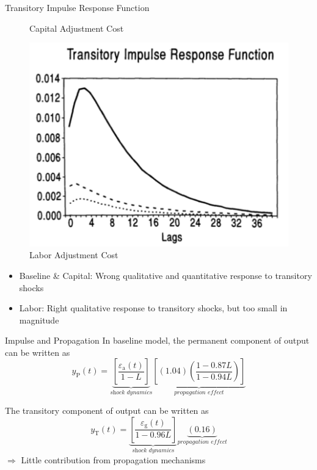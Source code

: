 \documentclass[10pt]{beamer}
\begin{document}
\begin{frame}{Transitory Impulse Response Function}
\begin{minipage}{0.33\textwidth}
\begin{figure}
            \caption{Capital Adjustment Cost}
        \end{figure}
    \end{minipage}%
    \begin{minipage}{0.33\textwidth}
        \begin{figure}
            \centering
            \includegraphics[width=\linewidth]{figures/L_trans_IRF.png}
            \caption{Labor Adjustment Cost}
        \end{figure}
    \end{minipage}
    \begin{itemize}
        \item Baseline \& Capital: Wrong qualitative and quantitative response to transitory
              shocks
        \item Labor: Right qualitative response to transitory shocks, but too small in
              magnitude
    \end{itemize}

\end{frame}

\begin{frame}{Impulse and Propagation}
    In baseline model, the permanent component of output can be written as
    $$
        y_{\mathrm{P}}(t)=\underbrace{\left[\frac{\varepsilon_{\mathrm{a}}(t)}{1-L}\right]}_{\textit{shock dynamics}}\underbrace{\left[(1.04)\left(\frac{1-0.87 L}{1-0.94 L}\right)\right]}_{\textit{propagation effect}}
    $$

    The transitory component of output can be written as $$
        y_{\mathrm{T}}(t)=\underbrace{\left[\frac{\varepsilon_{\mathrm{g}}(t)}{1-0.96
                    L}\right]}_{\textit{shock dynamics}}\underbrace{(0.16)}_{\textit{propagation
            effect}} $$ $\Rightarrow$ Little contribution from propagation mechanisms

\end{frame}
\end{document}
